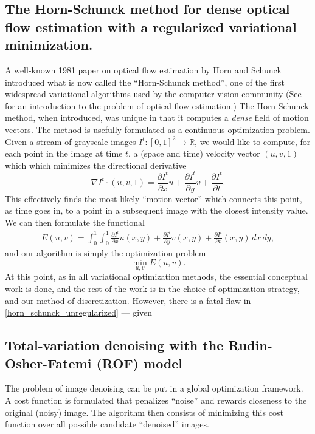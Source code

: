 \documentclass[conference]{IEEEtran}
\newcommand{\Part}[2]{\frac{\partial #1}{\partial #2}}
\begin{document}
\subsection{The Horn-Schunck method for dense optical flow estimation with a regularized variational minimization.}
A well-known 1981 paper on optical flow estimation by Horn and Schunck \cite{horn_schunck} introduced what is now called the ``Horn-Schunck method'', one of the
first widespread variational algorithms used by the computer vision community
(See \cite{szeliski} for an introduction to the problem of optical flow estimation.) The Horn-Schunck method, when introduced, was unique in that
it computes a \textit{dense} field of motion vectors. The method is usefully formulated as a continuous optimization problem.
Given a stream of grayscale images $I^t : [0,1]^2 \rightarrow \mathbb{R}$, we would like to compute, for each point in the image at time $t$, a (space and time) velocity vector $(u,v,1)$
which which minimizes the directional derivative
    $$\nabla I^t \cdot(u, v, 1) = \Part{I^t}{x} u + \Part{I^t}{y}v + \Part{I^t}{t}.$$
This effectively finds the most likely ``motion vector'' which connects this point, as time goes in, to a point
in a subsequent image with the closest intensity value.
We can then formulate the functional
\begin{align*}
    E(u, v) = \int_0^1\int_0^1 \Part{I^t}{x} u(x,y) + \Part{I^t}{y}v(x,y) + \Part{I^t}{t}(x,y) \,dx\,dy,
\end{align*}
and our algorithm is simply the optimization problem
\begin{equation}\label{horn_schunck_unregularized}
    \min_{u,v}E(u, v).
\end{equation}
At this point, as in all variational optimization methods,
the essential conceptual work is done, and the rest of the work is in the choice of optimization strategy,
and our method of discretization. However, there is a fatal flaw in \eqref{horn_schunck_unregularized} ---
given 





\subsection{Total-variation denoising with the Rudin-Osher-Fatemi (ROF) model}
The problem of image denoising can be put in a global optimization
framework. A cost function is formulated that penalizes ``noise'' and rewards closeness to the original (noisy) image. The algorithm then
consists of minimizing this cost function over all possible candidate ``denoised'' images.
\end{document}
